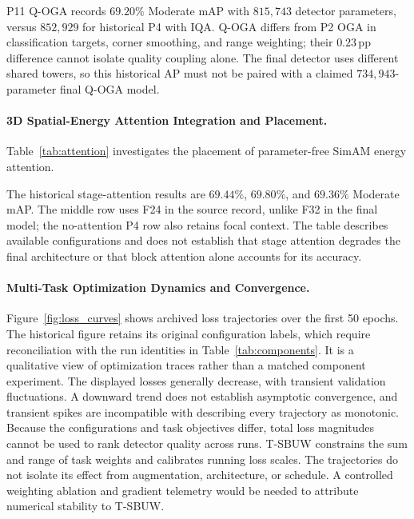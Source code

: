 P11 Q-OGA records $69.20\%$ Moderate mAP with $815{,}743$ detector parameters, versus $852{,}929$ for historical P4 with IQA. Q-OGA differs from P2 OGA in classification targets, corner smoothing, and range weighting; their $0.23\,\text{pp}$ difference cannot isolate quality coupling alone. The final detector uses different shared towers, so this historical AP must not be paired with a claimed $734{,}943$-parameter final Q-OGA model.

\paragraph{3D Spatial-Energy Attention Integration and Placement.}
Table~\ref{tab:attention} investigates the placement of parameter-free SimAM energy attention.



The historical stage-attention results are $69.44\%$, $69.80\%$, and $69.36\%$ Moderate mAP. The middle row uses F24 in the source record, unlike F32 in the final model; the no-attention P4 row also retains focal context. The table describes available configurations and does not establish that stage attention degrades the final architecture or that block attention alone accounts for its accuracy.

\paragraph{Multi-Task Optimization Dynamics and Convergence.}
Figure~\ref{fig:loss_curves} shows archived loss trajectories over the first 50 epochs. The historical figure retains its original configuration labels, which require reconciliation with the run identities in Table~\ref{tab:components}. It is a qualitative view of optimization traces rather than a matched component experiment.
The displayed losses generally decrease, with transient validation fluctuations. A downward trend does not establish asymptotic convergence, and transient spikes are incompatible with describing every trajectory as monotonic. Because the configurations and task objectives differ, total loss magnitudes cannot be used to rank detector quality across runs.
T-SBUW constrains the sum and range of task weights and calibrates running loss scales. The trajectories do not isolate its effect from augmentation, architecture, or schedule. A controlled weighting ablation and gradient telemetry would be needed to attribute numerical stability to T-SBUW.

